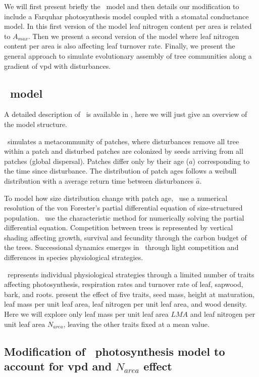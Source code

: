 \documentclass[a4paper,11pt]{article}
\begin{document}
We will first present briefly the \plant\ model and then details our modification to include a Farquhar photosynthesis model coupled with a stomatal conductance model. In this first version of the model leaf nitrogen content per area is related to $A_{max}$. Then we present a second version of the model where leaf nitrogen content per area is also affecting leaf turnover rate. Finally, we present the general approach to simulate evolutionary assembly of tree communities along a gradient of vpd with disturbances.

\subsection{\plant\ model}

A detailed description of \plant\ is available in \citet{Falster-2016,Falster-2017}, here we will just give an overview of the model structure.

\plant\ simulates a metacommunity of patches, where disturbances remove all tree within a patch and disturbed patches are colonized by seeds arriving from all patches (global dispersal). Patches differ only by their age ($a$) corresponding to the time since disturbance. The distribution of patch ages follows a weibull distribution with a average return time between disturbances $\hat{a}$.

To model how size distribution change with patch age, \plant\, use a numerical resolution of the von Forester's partial differential equation of size-structured population. \plant\ use the characteristic method for numerically solving the partial differential equation. Competition between trees is represented by vertical shading affecting growth, survival and fecundity through the carbon budget of the trees. Successional dynamics emerges in \plant\ through light competition and differences in species physiological strategies. 

\plant\ represents individual physiological strategies through a limited number of traits affecting photosynthesis, respiration rates and turnover rate of leaf, sapwood, bark, and roots. \citet{Falster-2018} present the effect of five traits, seed mass, height at maturation, leaf mass per unit leaf area, leaf nitrogen per unit leaf area, and wood density. Here we will explore only leaf mass per unit leaf area $LMA$ and leaf nitrogen per unit leaf area $N_{area}$, leaving the other traits fixed at a mean value. 

\subsection{Modification of \plant\ photosynthesis model to account for vpd and $N_{area}$ effect}
\end{document}
